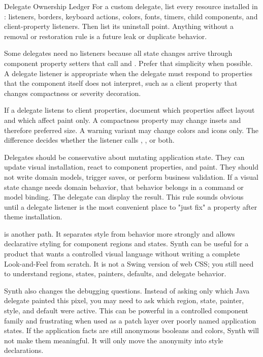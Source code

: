 \begin{detailbox}{Delegate Ownership Ledger}
For a custom delegate, list every resource installed in : listeners, borders, keyboard actions, colors, fonts, timers, child components, and client-property listeners. Then list its uninstall point. Anything without a removal or restoration rule is a future leak or duplicate behavior.
\end{detailbox}

Some delegates need no listeners because all state changes arrive through component property setters that call  and . Prefer that simplicity when possible. A delegate listener is appropriate when the delegate must respond to properties that the component itself does not interpret, such as a client property that changes compactness or severity decoration.

If a delegate listens to client properties, document which properties affect layout and which affect paint only. A compactness property may change insets and therefore preferred size. A warning variant may change colors and icons only. The difference decides whether the listener calls , , or both.

Delegates should be conservative about mutating application state. They can update visual installation, react to component properties, and paint. They should not write domain models, trigger saves, or perform business validation. If a visual state change needs domain behavior, that behavior belongs in a command or model binding. The delegate can display the result. This rule sounds obvious until a delegate listener is the most convenient place to "just fix" a property after theme installation.

 is another path. It separates style from behavior more strongly and allows declarative styling for component regions and states. Synth can be useful for a product that wants a controlled visual language without writing a complete Look-and-Feel from scratch. It is not a Swing version of web CSS; you still need to understand regions, states, painters, defaults, and delegate behavior.

Synth also changes the debugging questions. Instead of asking only which Java delegate painted this pixel, you may need to ask which region, state, painter, style, and default were active. This can be powerful in a controlled component family and frustrating when used as a patch layer over poorly named application states. If the application facts are still anonymous booleans and colors, Synth will not make them meaningful. It will only move the anonymity into style declarations.

